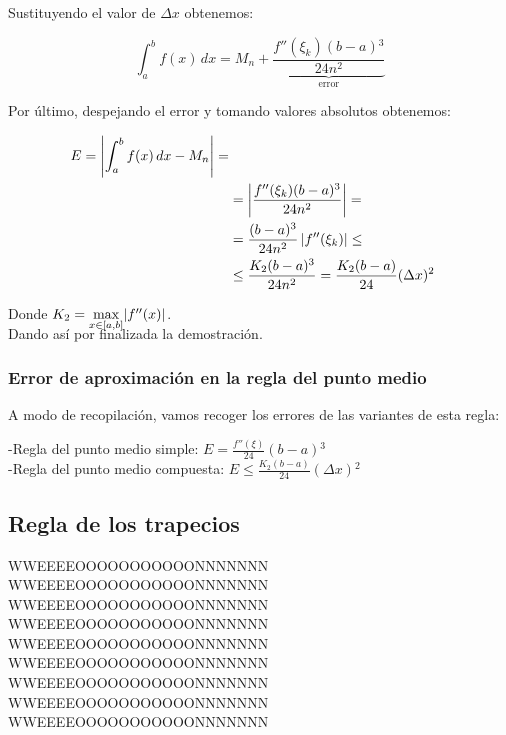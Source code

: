 \documentclass{article}
\begin{document}
			Sustituyendo el valor de $\Delta x$ obtenemos:
			
			\begin{equation}
				\int_{a}^{b} f(x) \,dx=M_n+\underbrace{\frac{f''(\xi_k)(b-a){^3}}{24n^2}}_{\text{error}}
			\end{equation}
			
			Por último, despejando el error y tomando valores absolutos obtenemos:
			
			\begin{align}
				E=\left\lvert \int_{a}^{b} f(x) \,dx-M_n \right\rvert= \notag \\
				&=\left\lvert \frac{f''(\xi_k)(b-a){^3}}{24n^2} \right\rvert= \notag \\
				&=\frac{(b-a){^3}}{24n^2}\left\lvert f''(\xi_k) \right\rvert\leq \notag \\
				&\leq \frac{K_2(b-a){^3}}{24n^2}=\frac{K_2(b-a)}{24}(\Delta x){^2}
			\end{align}
			
			Donde $K_2=\smash{\displaystyle\max_{x \in [a,b]}} |f''(x)|$. \\

			Dando así por finalizada la demostración. 
			
			\subsubsection{Error de aproximación en la regla del punto medio}
			
			A modo de recopilación, vamos recoger los errores de las variantes de esta regla:
			
			\begin{flushleft}
				-Regla del punto medio simple: $E = \frac{f''(\xi)}{24} (b - a){^3}$\\
				-Regla del punto medio compuesta: $E \leq \frac{K_2(b-a)}{24}(\Delta x){^2}$\\
			\end{flushleft}
			

	\subsection{Regla de los trapecios}

	WWEEEEOOOOOOOOOOONNNNNNN  	WWEEEEOOOOOOOOOOONNNNNNN  	WWEEEEOOOOOOOOOOONNNNNNN  	WWEEEEOOOOOOOOOOONNNNNNN  	WWEEEEOOOOOOOOOOONNNNNNN  	WWEEEEOOOOOOOOOOONNNNNNN  	WWEEEEOOOOOOOOOOONNNNNNN  	WWEEEEOOOOOOOOOOONNNNNNN  	WWEEEEOOOOOOOOOOONNNNNNN  
	
\end{document}

